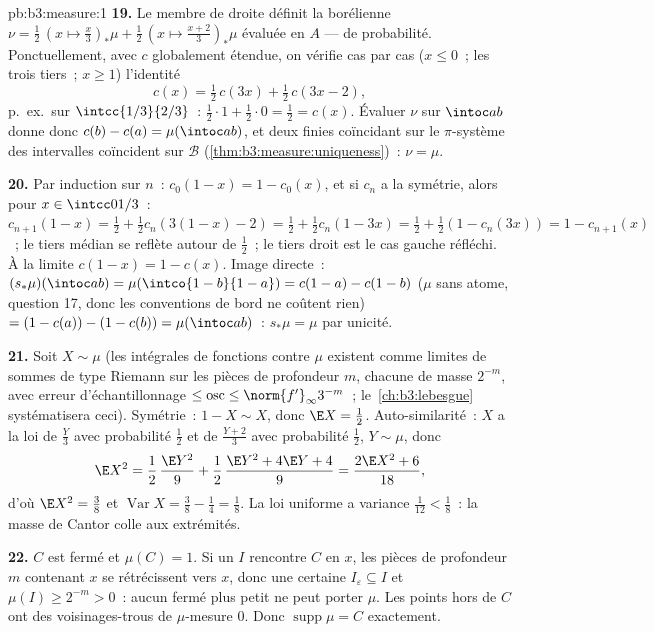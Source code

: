 \begin{solution}{pb:b3:measure:1}
\textbf{19.} Le membre de droite définit la  borélienne
$\nu = \frac12\,(x \mapsto \tfrac x3)_*\mu + \frac12\,(x
\mapsto \tfrac{x+2}3)_*\mu$ évaluée en $A$ ---  de
probabilité. Ponctuellement, avec $c$ globalement étendue,
on vérifie cas par cas ($x \leq 0$~; les trois tiers~; $x
\geq 1$) l'identité
\[
c(x) = \tfrac12\,c(3x) + \tfrac12\,c(3x - 2),
\]
p.~ex.\ sur $\intcc{1/3}{2/3}$~: $\frac12\cdot1 +
\frac12\cdot0 = \frac12 = c(x)$. Évaluer $\nu$ sur $\intoc
ab$ donne donc $c(b) - c(a) = \mu(\intoc ab)$, et deux
 finies coïncidant sur le $\pi$-système des
intervalles  coïncident sur $\mathcal B$
(\cref{thm:b3:measure:uniqueness})~: $\nu = \mu$.

\textbf{20.} Par induction sur $n$~: $c_0(1-x) = 1 -
c_0(x)$, et si $c_n$ a la symétrie, alors pour $x \in
\intcc0{1/3}$~: $c_{n+1}(1 - x) = \frac12 + \frac12c_n(3(1-x)
- 2) = \frac12 + \frac12c_n(1 - 3x) = \frac12 + \frac12(1 -
c_n(3x)) = 1 - c_{n+1}(x)$~; le tiers médian se reflète
autour de $\frac12$~; le tiers droit est le cas gauche
réfléchi. À la limite $c(1-x) = 1 - c(x)$. Image
directe~: $(s_*\mu)(\intoc ab) = \mu(\intco{1-b}{1-a}) =
c(1-a) - c(1-b)$ ($\mu$ sans atome, question 17, donc les
conventions de bord ne coûtent rien) $= (1 - c(a)) - (1 -
c(b)) = \mu(\intoc ab)$~: $s_*\mu = \mu$ par unicité.

\textbf{21.} Soit $X \sim \mu$ (les intégrales de fonctions
 contre $\mu$ existent comme limites de sommes de
type Riemann sur les pièces de profondeur $m$, chacune de
masse $2^{-m}$, avec erreur d'échantillonnage $\leq
\operatorname{osc} \leq \norm{f'}_\infty3^{-m}$~;
le~\cref{ch:b3:lebesgue} systématisera ceci). Symétrie~: $1
- X \sim X$, donc $\E X = \frac12$. Auto-similarité~: $X$ a
la loi de $\frac Y3$ avec probabilité $\frac12$ et de
$\frac{Y+2}3$ avec probabilité $\frac12$, $Y \sim \mu$,
donc
\[
\E X^2 = \frac12\,\frac{\E Y^2}9 + \frac12\,
\frac{\E Y^2 + 4\E Y + 4}{9} = \frac{2\E X^2 + 6}{18},
\]
d'où $\E X^2 = \frac38$ et $\operatorname{Var}X = \frac38
- \frac14 = \frac18$. La loi uniforme a variance $\frac1{12}
< \frac18$~: la masse de Cantor colle aux extrémités.

\textbf{22.} $C$ est fermé et $\mu(C) = 1$. Si un  $I$
rencontre $C$ en $x$, les pièces de profondeur $m$
contenant $x$ se rétrécissent vers $x$, donc une certaine
$I_\varepsilon \subseteq I$ et $\mu(I) \geq 2^{-m} > 0$~:
aucun fermé plus petit ne peut porter $\mu$. Les points hors
de $C$ ont des voisinages-trous de $\mu$-mesure $0$. Donc
$\operatorname{supp}\mu = C$ exactement.


\end{solution}

